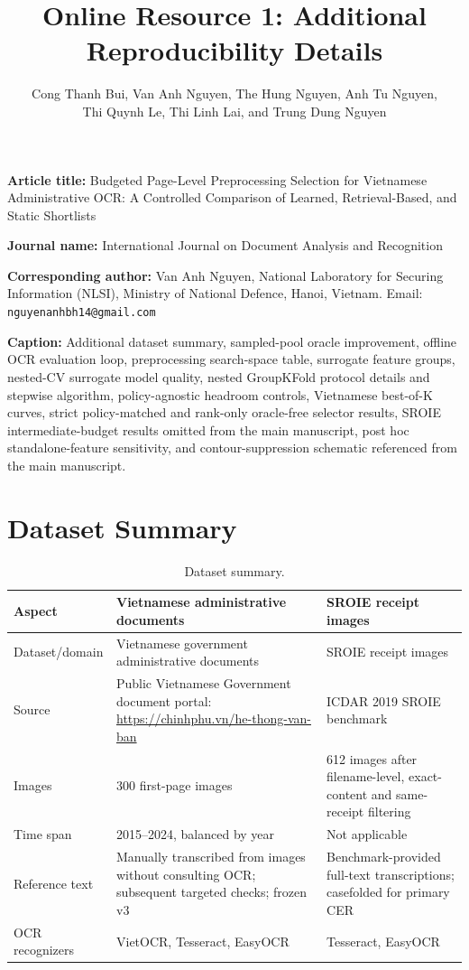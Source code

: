 \documentclass{article}
\title{Online Resource 1: Additional Reproducibility Details}
\author{\begin{tabular}{c}Cong Thanh Bui, Van Anh Nguyen, The Hung Nguyen, Anh Tu Nguyen,\\ Thi Quynh Le, Thi Linh Lai, and Trung Dung Nguyen\end{tabular}}
\date{}
\begin{document}
\maketitle

\noindent\textbf{Article title:} Budgeted Page-Level Preprocessing Selection for Vietnamese Administrative OCR: A Controlled Comparison of Learned, Retrieval-Based, and Static Shortlists

\noindent\textbf{Journal name:} International Journal on Document Analysis and Recognition

\noindent\textbf{Corresponding author:} Van Anh Nguyen, National Laboratory for Securing Information (NLSI), Ministry of National Defence, Hanoi, Vietnam. Email: \texttt{nguyenanhbh14@gmail.com}

\bigskip
\noindent\textbf{Caption:} Additional dataset summary, sampled-pool oracle improvement, offline OCR evaluation loop, preprocessing search-space table, surrogate feature groups, nested-CV surrogate model quality, nested GroupKFold protocol details and stepwise algorithm, policy-agnostic headroom controls, Vietnamese best-of-K curves, strict policy-matched and rank-only oracle-free selector results, SROIE intermediate-budget results omitted from the main manuscript, post hoc standalone-feature sensitivity, and contour-suppression schematic referenced from the main manuscript.

\section{Dataset Summary}

\begin{table}[h]
\centering
\caption{Dataset summary.}
\begin{tabularx}{\textwidth}{p{3.2cm} X X}
\toprule
Aspect & Vietnamese administrative documents & SROIE receipt images \\
\midrule
Dataset/domain & Vietnamese government administrative documents & SROIE receipt images \\
Source & Public Vietnamese Government document portal: \url{https://chinhphu.vn/he-thong-van-ban} & ICDAR 2019 SROIE benchmark \\
Images & 300 first-page images & 612 images after filename-level, exact-content and same-receipt filtering \\
Time span & 2015--2024, balanced by year & Not applicable \\
Reference text & Manually transcribed from images without consulting OCR; subsequent targeted checks; frozen v3 & Benchmark-provided full-text transcriptions; casefolded for primary CER \\
OCR recognizers & VietOCR, Tesseract, EasyOCR & Tesseract, EasyOCR \\
\bottomrule
\end{tabularx}
\end{table}
\end{document}

